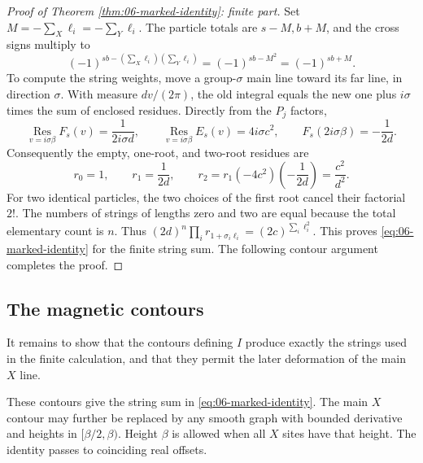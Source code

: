 \begin{proof}[Proof of Theorem \ref{thm:06-marked-identity}: finite part]
Set \(M=-\sum_X\ell_i=-\sum_Y\ell_i\).
The particle totals are \(s-M,b+M\), and the cross signs multiply to
\[
 (-1)^{sb-(\sum_X\ell_i)(\sum_Y\ell_i)}
 =(-1)^{sb-M^2}=(-1)^{sb+M}.
\]
To compute the string weights, move a group-\(\sigma\) main line
toward its far line, in direction \(\sigma\). With measure \(dv/(2\pi)\),
the old integral equals the new one plus \(i\sigma\) times the
sum of enclosed residues. Directly from the \(P_j\) factors,
\begin{equation}
 \operatorname*{Res}_{v=i\sigma\beta}F_s(v)=\frac1{2i\sigma d},
 \qquad
 \operatorname*{Res}_{v=i\sigma\beta}E_s(v)=4i\sigma c^2,
 \qquad F_s(2i\sigma\beta)=-\frac1{2d}.
 \label{eq:06-string-residues}
\end{equation}
Consequently the empty, one-root, and two-root residues are
\[
 r_0=1,\qquad r_1=\frac1{2d},\qquad
 r_2=r_1(-4c^2)\left(-\frac1{2d}\right)=\frac{c^2}{d^2}.
\]
For two identical particles, the two choices of the first root cancel
their factorial \(2!\).
The numbers of strings of lengths zero and two are equal because the
total elementary count is \(n\).  Thus
\((2d)^n\prod_i r_{1+\sigma_i\ell_i}
=(2c)^{\sum_i\ell_i^2}\).
This proves \eqref{eq:06-marked-identity} for the finite string sum.
The following contour argument completes the proof.
\end{proof}

\subsection{The magnetic contours}

It remains to show that the contours defining \(I\) produce exactly
the strings used in the finite calculation, and that they permit
the later deformation of the main \(X\) line.

\begin{lemma}
\label{lem:06-contours}
These contours give the string sum in
\eqref{eq:06-marked-identity}.  The main \(X\) contour may further be
replaced by any smooth graph with bounded derivative and heights in
\([\beta/2,\beta)\).  Height \(\beta\) is allowed when all \(X\) sites
have that height.  The identity passes to coinciding real offsets.
\end{lemma}

